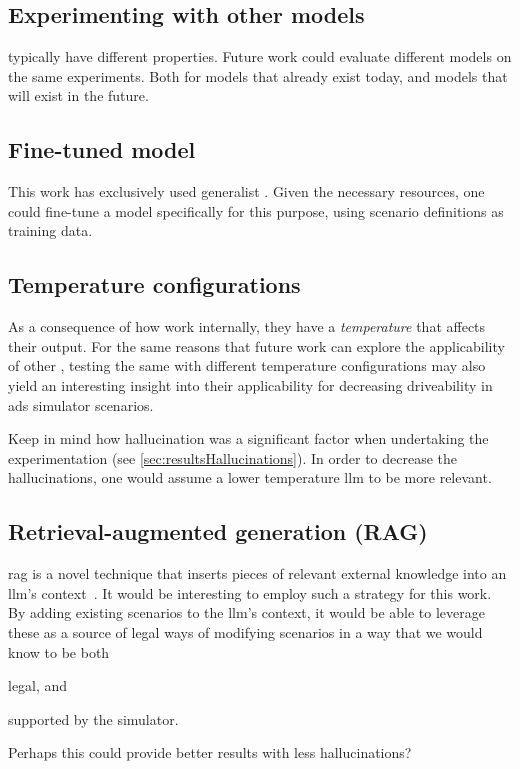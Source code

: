 \subsection{Experimenting with other models}

 typically have different properties. Future work could evaluate different models
on the same experiments. Both for models that already exist today, and models that will exist in the future.

\subsection{Fine-tuned model}

This work has exclusively used generalist . Given the necessary resources, one could
fine-tune a model specifically for this purpose, using scenario definitions as training data.

\subsection{Temperature configurations}
As a consequence of how  work internally, they have a \emph{temperature} that
affects their output. For the same reasons that future work can explore the applicability of other
, testing the same  with different temperature configurations may
also yield an interesting insight into their applicability for decreasing driveability in
\acrshort{ads} simulator scenarios.

Keep in mind how hallucination was a significant factor when undertaking the experimentation (see
\cref{sec:resultsHallucinations}). In order to decrease the hallucinations, one would assume a lower
temperature \acrshort{llm} to be more relevant.

\subsection{Retrieval-augmented generation (RAG)}

\acrfull{rag} is a novel technique that inserts pieces of relevant external knowledge into an
\acrshort{llm}'s context~\cite[88-89]{llmSurvey}. It would be interesting to employ such a strategy
for this work. By adding existing scenarios to the \acrshort{llm}'s context, it would be able to
leverage these as a source of legal ways of modifying scenarios in a way that we would know to be
both \begin{inparaenum}
    \item legal, and
    \item supported by the simulator.
\end{inparaenum} Perhaps this could provide better results with less hallucinations?

